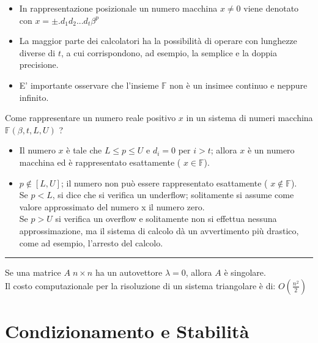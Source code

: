 \documentclass{article}
\newcommand\separationline{\noindent\rule{\textwidth}{0.4pt}} %
\begin{document}
		\begin{itemize}
			\item In rappresentazione posizionale un numero macchina $x \neq 0$ viene denotato con $x = \pm .d_1 d_2 ... d_t \beta ^p$
			\item La maggior parte dei calcolatori ha la possibilità di operare con lunghezze diverse di $t$, a cui corrispondono, ad esempio, la semplice e la doppia precisione.
			\item E' importante osservare che l'insieme $\mathbb{F}$ non è un insimee continuo e neppure infinito.
		\end{itemize}
		Come rappresentare un numero reale positivo $x$ in un sistema di numeri macchina $\mathbb{F} ( \beta, t, L, U)$ ?
		\begin{itemize}
			\item Il numero $x$ è tale che $L \leq p \leq U$ e $d_i = 0$ per $i > t$; allora $x$ è un numero macchina ed è rappresentato esattamente ({\color{blue} $x \in \mathbb{F}$}).
			\item $p \notin \left [ L, U \right ]$; il numero non può essere rappresentato esattamente ({\color{blue} $x \notin \mathbb{F}$}).
			\\Se $p < L$, si dice che si verifica un underflow; solitamente si assume come valore approssimato del numero x il numero zero.
			\\Se $p > U$ si verifica un overflow e solitamente non si effettua nessuna approssimazione, ma il sistema di calcolo dà un avvertimento più drastico, come ad esempio, l'arresto del calcolo.
		\end{itemize}

		\separationline

		Se una matrice $A \; n \times n$ ha un autovettore $\lambda = 0$, allora $A$ è singolare.\\
		Il costo computazionale per la risoluzione di un sistema triangolare è di: 
		$O ( \frac{n^2}{2} ) $

	\section{Condizionamento e Stabilità}
\end{document}
